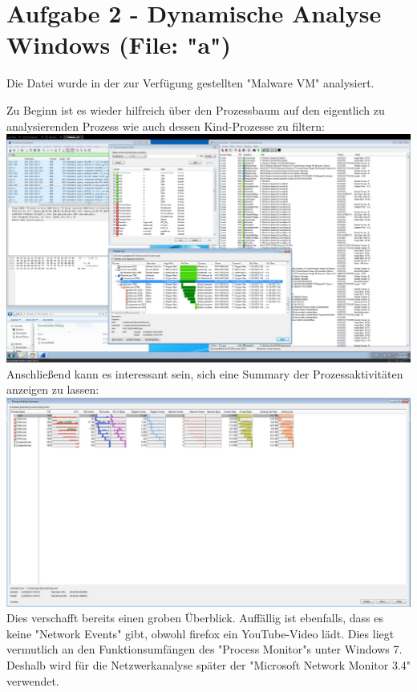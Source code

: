 \documentclass{article}
\begin{document}
	\section*{Aufgabe 2 - Dynamische Analyse Windows (File: "a")}
	\begin{mynote}
		Die Datei wurde in der zur Verfügung gestellten "Malware VM" analysiert.
	\end{mynote}
	Zu Beginn ist es wieder hilfreich über den Prozessbaum auf den eigentlich zu analysierenden Prozess wie auch dessen Kind-Prozesse zu filtern:\\
	\includegraphics[width=1\linewidth]{"pictures/2.1 main"}
	Anschließend kann es interessant sein, sich eine Summary der Prozessaktivitäten anzeigen zu lassen:\\
	\includegraphics[width=1\linewidth]{"pictures/2.1 main2"}
	Dies verschafft bereits einen groben Überblick. Auffällig ist ebenfalls, dass es keine "Network Events" gibt, obwohl firefox ein YouTube-Video lädt. Dies liegt vermutlich an den Funktionsumfängen des "Process Monitor"s unter Windows 7. Deshalb wird für die Netzwerkanalyse später der "Microsoft Network Monitor 3.4" verwendet.\\
	
\end{document}
